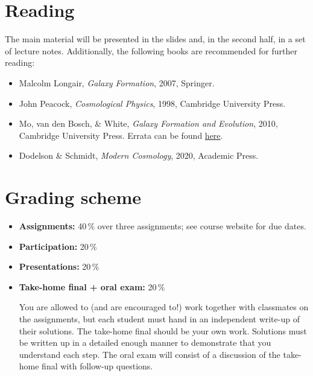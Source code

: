 \documentclass{article}
\begin{document}
\section*{Reading}

The main material will be presented in the slides and, in the second half, in 
a set of lecture notes. Additionally, the following books are recommended for
further reading:

\begin{itemize}

  \item Malcolm Longair, \emph{Galaxy Formation},
    2007, Springer.

  \item John Peacock, \emph{Cosmological Physics},
    1998, Cambridge University Press.

  \item Mo, van den Bosch, \& White, \emph{Galaxy Formation and Evolution},
    2010, Cambridge University Press. Errata can be found
    \href{http://people.umass.edu/hjmo/book/errata.pdf}{here}.

  \item Dodelson \& Schmidt, \emph{Modern Cosmology},
    2020, Academic Press.

\end{itemize}

\section*{Grading scheme}

\begin{itemize}

  \item {\bf Assignments:} 40\,\% over three assignments; see course website for due dates.

  \item {\bf Participation:} 20\,\%

  \item {\bf Presentations:} 20\,\%

  \item {\bf Take-home final + oral exam:} 20\,\%

You are allowed to (and are encouraged to!) work together with
classmates on the assignments, but each student must hand in an
independent write-up of their solutions. The take-home final should be
your own work. Solutions must be written up in a detailed enough
manner to demonstrate that you understand each step. The oral exam
will consist of a discussion of the take-home final with follow-up
questions.

\end{itemize}
\end{document}
